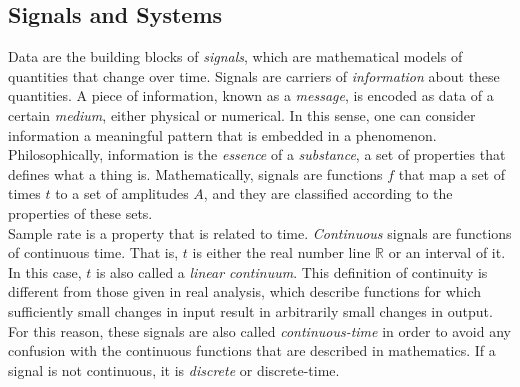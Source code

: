 



\subsection{Signals and Systems}

Data are the building blocks of \textit{signals}, which are mathematical models of quantities that change over time. Signals are carriers of \textit{information} about these quantities. A piece of information, known as a \textit{message}, is encoded as data of a certain \textit{medium}, either physical or numerical. In this sense, one can consider information a meaningful pattern that is embedded in a phenomenon. Philosophically, information is the \textit{essence} of a \textit{substance}, a set of properties that defines what a thing is. Mathematically, signals are functions $f$ that map a set of times $t$ to a set of amplitudes $A$, and they are classified according to the properties of these sets. \\

Sample rate is a property that is related to time. \textit{Continuous} signals are functions of continuous time. That is, $t$ is either the real number line $\mathbb{R}$ or an interval of it. In this case, $t$ is also called a \textit{linear continuum}. This definition of continuity is different from those given in real analysis, which describe functions for which sufficiently small changes in input result in arbitrarily small changes in output. For this reason, these signals are also called \textit{continuous-time} in order to avoid any confusion with the continuous functions that are described in mathematics. If a signal is not continuous, it is \textit{discrete} or discrete-time. \\

